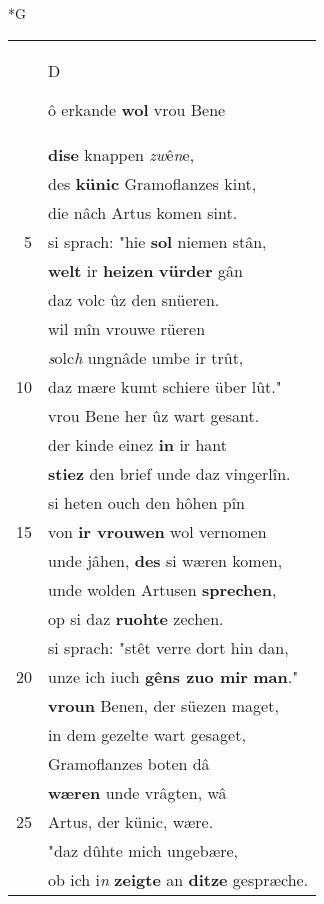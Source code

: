 \documentclass[8pt,a4paper,notitlepage]{article}
\begin{document}
\begin{table}[ht]
\begin{minipage}[t]{0.5\linewidth}
\small
\begin{center}*G
\end{center}
\begin{tabular}{rl}
 & \begin{large}D\end{large}ô erkande \textbf{wol} vrou Bene\\ 
 & \textbf{dise} knappen \textit{zw}ê\textit{n}e,\\ 
 & des \textbf{künic} Gramoflanzes kint,\\ 
 & die nâch Artus komen sint.\\ 
5 & si sprach: "hie \textbf{sol} niemen stân,\\ 
 & \textbf{welt} ir \textbf{heizen} \textbf{vürder} gân\\ 
 & daz volc ûz den snüeren.\\ 
 & wil mîn vrouwe rüeren\\ 
 & \textit{s}olc\textit{h} ungnâde umbe ir trût,\\ 
10 & daz mære kumt schiere über lût."\\ 
 & vrou Bene her ûz wart gesant.\\ 
 & der kinde einez \textbf{in} ir hant\\ 
 & \textbf{stiez} den brief unde daz vingerlîn.\\ 
 & si heten ouch den hôhen pîn\\ 
15 & von \textbf{ir vrouwen} wol vernomen\\ 
 & unde jâhen, \textbf{des} si wæren komen,\\ 
 & unde wolden Artusen \textbf{sprechen},\\ 
 & op si daz \textbf{ruohte} zechen.\\ 
 & si sprach: "stêt verre dort hin dan,\\ 
20 & unze ich iuch \textbf{gêns zuo mir} \textbf{man}."\\ 
 & \textbf{vroun} Benen, der süezen maget,\\ 
 & in dem gezelte wart gesaget,\\ 
 & Gramoflanzes boten dâ\\ 
 & \textbf{wæren} unde vrâgten, wâ\\ 
25 & Artus, der künic, wære.\\ 
 & "daz dûhte mich ungebære,\\ 
 & ob ich i\textit{n} \textbf{zeigte} an \textbf{ditze} gespræche.\\ 

\end{tabular}
\end{minipage}
\end{table}
\end{document}
